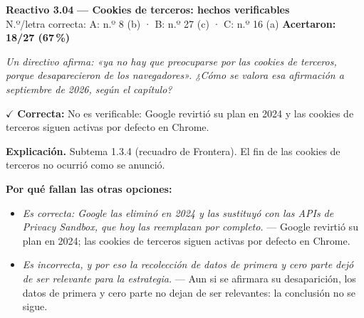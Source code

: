 \documentclass[10pt,letterpaper]{article}
\begin{document}
\begin{minipage}{\textwidth}
{\color{guinda}\textbf{Reactivo 3.04}} \textbf{— Cookies de terceros: hechos verificables}\\[-1pt]
{\scriptsize N.º/letra correcta: A: n.º 8 (b) · B: n.º 27 (c) · C: n.º 16 (a) \hfill \textbf{Acertaron: 18/27 (67\,\%)}}

\textit{Un directivo afirma: «ya no hay que preocuparse por las cookies de terceros, porque desaparecieron de los navegadores». ¿Cómo se valora esa afirmación a septiembre de 2026, según el capítulo?}

\textcolor{verde}{$\checkmark$} \textbf{Correcta:} No es verificable: Google revirtió su plan en 2024 y las cookies de terceros siguen activas por defecto en Chrome.

\textbf{Explicación.} Subtema 1.3.4 (recuadro de Frontera). El fin de las cookies de terceros no ocurrió como se anunció.

\textbf{Por qué fallan las otras opciones:}
\begin{itemize}[itemsep=0pt,topsep=1pt,leftmargin=1.3em,parsep=0pt]
\item[\textcolor{rojo}{$\times$}] \textit{Es correcta: Google las eliminó en 2024 y las sustituyó con las APIs de Privacy Sandbox, que hoy las reemplazan por completo.} --- Google revirtió su plan en 2024; las cookies de terceros siguen activas por defecto en Chrome.
\item[\textcolor{rojo}{$\times$}] \textit{Es incorrecta, y por eso la recolección de datos de primera y cero parte dejó de ser relevante para la estrategia.} --- Aun si se afirmara su desaparición, los datos de primera y cero parte no dejan de ser relevantes: la conclusión no se sigue.
\end{itemize}
\end{minipage}\par\vspace{5pt}{\color{gray!40}\hrule}\vspace{5pt}
\end{document}
